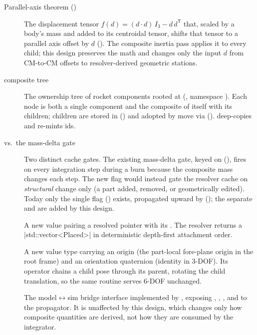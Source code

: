 \begin{description}
\item[Parallel-axis theorem ()] The displacement tensor
  $f(d) = (d\cdot d)\,I_3 - d\,d^{\mathsf T}$ that, scaled by a body's mass and added to
  its centroidal tensor, shifts that tensor to a parallel axis offset by $d$
  (). The composite inertia pass applies it to every child;
  this design preserves the math and changes only the input $d$ from CM-to-CM offsets to
  resolver-derived geometric stations.

\item[ composite tree] The ownership tree of rocket components rooted at
   (, namespace ). Each node is both
  a single component and the composite of itself with its children; children are stored in
   () and adopted by move via
   ().  deep-copies and
  re-mints ids.

\item[ vs.\ the mass-delta gate] Two distinct cache gates. The
  existing mass-delta gate,  keyed on
   (), fires on every integration
  step during a burn because the composite mass changes each step. The new
   flag would instead gate the resolver cache on \emph{structural}
  change only (a part added, removed, or geometrically edited). Today only the single
   flag () exists, propagated upward by
   (); the separate
   and  are added by this design.

\item[] A new value pairing a resolved  pointer with its
  . The resolver returns a \cppinline|std::vector<Placed>| in deterministic
  depth-first attachment order.

\item[] A new value type carrying an origin (the part-local fore-plane origin in
  the root frame) and an orientation quaternion (identity in 3-DOF). Its 
  operator chains a child pose through its parent, rotating the child translation, so the
  same routine serves 6-DOF unchanged.

\item[] The model$\leftrightarrow$sim bridge interface implemented by
  , exposing , , , and
   to the propagator. It is unaffected by this design, which
  changes only how composite quantities are derived, not how they are consumed by the
  integrator.


\end{description}
